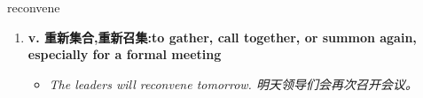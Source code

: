 
\begin{frame}
{\huge reconvene}
\begin{center}
\begin{enumerate}\Large
  \item \textbf{v. 重新集合,重新召集:to gather, call together, or summon again, especially for a formal meeting}
  \begin{itemize}
    \item \em{\Large{The leaders will reconvene tomorrow. 明天领导们会再次召开会议。}}
  \end{itemize}
\end{enumerate}
\end{center}
\end{frame}
